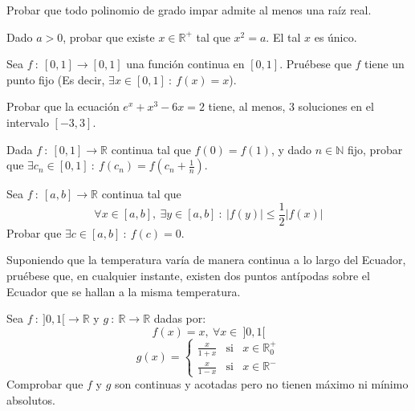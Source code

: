 \begin{ejercicio}
    Probar que todo polinomio de grado impar admite al menos una raíz real.
\end{ejercicio}

\begin{ejercicio}
    Dado $a > 0$, probar que existe $x \in \mathbb{R^+}$ tal que $x^2 = a$. El tal $x$ es único.
\end{ejercicio}

\begin{ejercicio}
    Sea $f ~:~ [0,1] \longrightarrow [0,1]$ una función continua en $[0,1]$. Pruébese que $f$ tiene un punto fijo (Es decir, $\exists x \in [0,1] ~:~ f(x) = x$).
\end{ejercicio}

\begin{ejercicio}
    Probar que la ecuación $e^x+x^3-6x = 2$ tiene, al menos, $3$ soluciones en el intervalo $[-3,3]$.
\end{ejercicio}

\begin{ejercicio}
    Dada $f ~:~ [0,1] \longrightarrow \mathbb{R}$ continua tal que $f(0) = f(1)$, y dado $n\in \mathbb{N}$ fijo, probar que $\exists c_n \in [0,1] ~:~ f(c_n) = f(c_n + \frac{1}{n})$.
\end{ejercicio}

\begin{ejercicio}
    Sea $f ~:~ [a,b] \longrightarrow \mathbb{R}$ continua tal que
    \begin{equation*}
        \forall x \in [a,b], ~ \exists y \in [a,b] ~:~ |f(y)| \leq \frac{1}{2} |f(x)|
    \end{equation*}
    Probar que $\exists c \in [a,b] ~:~ f(c) = 0$.
\end{ejercicio}

\begin{ejercicio}
    Suponiendo que la temperatura varía de manera continua a lo largo del Ecuador, pruébese que, en cualquier instante, existen dos puntos antípodas sobre el Ecuador que se hallan a la misma temperatura.
\end{ejercicio}

\begin{ejercicio}
    Sea $f ~:~ ]0,1[ \longrightarrow \mathbb{R}$ y $g ~:~ \mathbb{R} \longrightarrow \mathbb{R}$ dadas por:
    \begin{equation*}
        f(x) = x, ~ \forall x \in ~ ]0,1[
    \end{equation*}
    \begin{equation*}
        g(x) =
        \left\{ \begin{array}{ccl}
            \frac{x}{1+x} & \text{si} & x \in \mathbb{R}^+_0 \\
            \frac{x}{1-x} & \text{si} & x \in \mathbb{R}^-
            \end{array}
        \right.
    \end{equation*}
    Comprobar que $f$ y $g$ son continuas y acotadas pero no tienen máximo ni mínimo absolutos.
\end{ejercicio}

